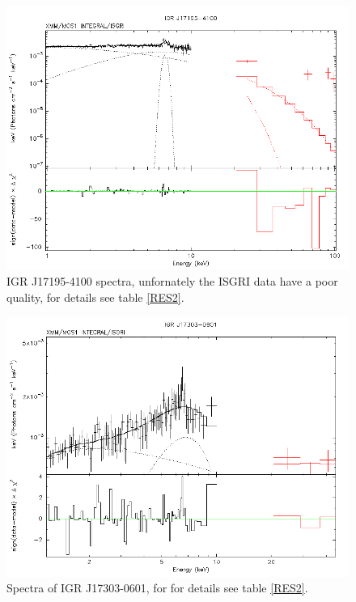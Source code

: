 \documentclass[oneside,a4paper,11pt]{report}
\begin{document}
\begin{figure}[!hbt]
\centering
\includegraphics[totalheight=8cm]{spec/4}
\caption{IGR J17195-4100 spectra, unfornately the ISGRI data have a poor quality, for details see table \ref{RES2}. }
\label{sp4} 
\end{figure}

\begin{figure}[!hbt]
\centering
\includegraphics[totalheight=8cm]{spec/5}
\caption{Spectra of IGR J17303-0601, for for details see table \ref{RES2}. }
\label{sp5} 
\end{figure}
\end{document}
